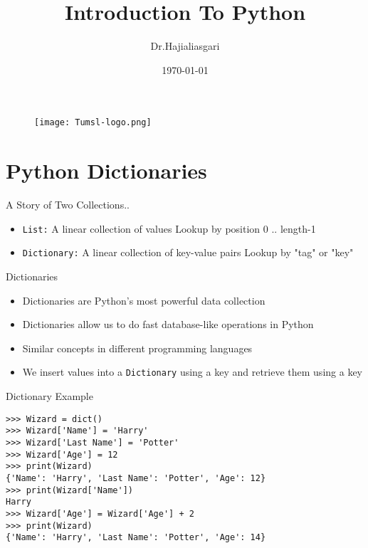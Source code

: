\documentclass[serif, aspectratio=169]{beamer}
\author{Dr.Hajialiasgari}
\title{Introduction To Python}
\institute{
    Tehran University \\
    Of\\
    Medical Science
}
\date{\small \today}
\begin{document}
\begin{frame}
    \titlepage
    \vspace*{-0.6cm}
    \begin{figure}[htpb]
        \begin{center}
            \texttt{[image: Tumsl-logo.png]}
        \end{center}
    \end{figure}
\end{frame}

\begin{frame}    
\tableofcontents[sectionstyle=show, subsectionstyle=show/shaded/hide, subsubsectionstyle=show/shaded/hide]
\end{frame}

\section{Python Dictionaries}

\begin{frame}{A Story of Two Collections..}
    \begin{itemize}
        \item \texttt{\color{red}List:} A linear collection of values Lookup by position 0 .. length-1
        \item \texttt{\color{red}Dictionary:} A linear collection of key-value pairs Lookup by "tag" or "key"

    \end{itemize}
\end{frame}

\begin{frame}{Dictionaries}
    \begin{itemize}
        \item Dictionaries are Python’s most powerful data collection
        \item Dictionaries allow us to do fast database-like operations in Python
        \item Similar concepts in different programming languages
        \item We insert values into a  \texttt{\color{red}Dictionary} using a key and retrieve them using a key
    \end{itemize}
\end{frame}

\begin{frame}[fragile]{Dictionary Example}
    \begin{lstlisting}
>>> Wizard = dict()
>>> Wizard['Name'] = 'Harry'
>>> Wizard['Last Name'] = 'Potter'
>>> Wizard['Age'] = 12
>>> print(Wizard)
{'Name': 'Harry', 'Last Name': 'Potter', 'Age': 12}
>>> print(Wizard['Name'])
Harry
>>> Wizard['Age'] = Wizard['Age'] + 2
>>> print(Wizard)
{'Name': 'Harry', 'Last Name': 'Potter', 'Age': 14}
    \end{lstlisting}
\end{frame}
\end{document}
